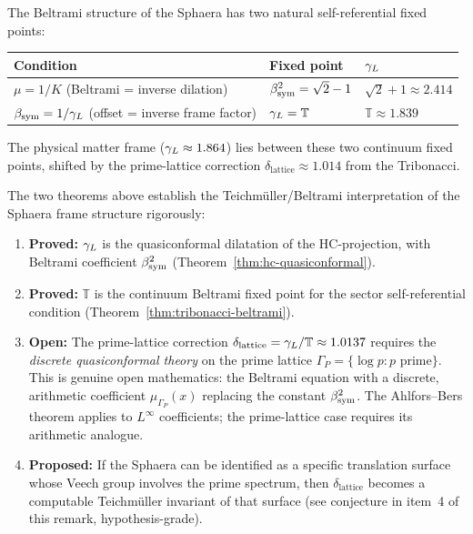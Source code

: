 \begin{remark}
\label{rem:two-fixed-points}
The Beltrami structure of the Sphaera has two natural self-referential
fixed points:
\begin{center}
\renewcommand{\arraystretch}{1.3}
\begin{tabular}{lll}
\toprule
Condition & Fixed point & $\gamma_L$ \\
\midrule
$\mu = 1/K$ (Beltrami = inverse dilation) & $\beta_{\mathrm{sym}}^2 = \sqrt{2}-1$ & $\sqrt{2}+1 \approx 2.414$ \\
$\beta_{\mathrm{sym}} = 1/\gamma_L$ (offset = inverse frame factor) & $\gamma_L = \mathbb{T}$ & $\mathbb{T} \approx 1.839$ \\
\bottomrule
\end{tabular}
\end{center}
The physical matter frame ($\gamma_L \approx 1.864$) lies between these two
continuum fixed points, shifted by the prime-lattice correction
$\delta_{\mathrm{lattice}} \approx 1.014$ from the Tribonacci.
\end{remark}

\begin{remark}
\label{rem:teichmuller-status}
The two theorems above establish the Teichmüller/Beltrami interpretation
of the Sphaera frame structure rigorously:
\begin{enumerate}[label=(\arabic*)]
 \item \textbf{Proved:} $\gamma_L$ is the quasiconformal dilatation of the
 HC-projection, with Beltrami coefficient $\beta_{\mathrm{sym}}^2$
 (Theorem~\ref{thm:hc-quasiconformal}).
 \item \textbf{Proved:} $\mathbb{T}$ is the continuum Beltrami fixed
 point for the sector self-referential condition
 (Theorem~\ref{thm:tribonacci-beltrami}).
 \item \textbf{Open:} The prime-lattice correction
 $\delta_{\mathrm{lattice}} = \gamma_L/\mathbb{T} \approx 1.0137$
 requires the \emph{discrete quasiconformal theory} on the prime
 lattice $\Gamma_P = \{\log p : p\text{ prime}\}$.
 This is genuine open mathematics: the Beltrami equation with
 a discrete, arithmetic coefficient $\mu_{\Gamma_P}(x)$ replacing
 the constant $\beta_{\mathrm{sym}}^2$.
 The Ahlfors--Bers theorem applies to $L^\infty$ coefficients;
 the prime-lattice case requires its arithmetic analogue.
 \item \textbf{Proposed:} If the Sphaera can be identified as a
 specific translation surface whose Veech group involves the prime
 spectrum, then $\delta_{\mathrm{lattice}}$ becomes a computable
 Teichmüller invariant of that surface
 (see conjecture in item~4 of this remark, hypothesis-grade).
\end{enumerate}
\end{remark}


